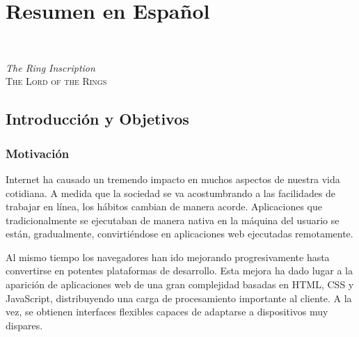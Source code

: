 \chapter{Resumen en Español} %
\label{cha:resumen_en_espanol}

\setlength{\epigraphwidth}{9.5cm}

\epigraph{
\tengwarannataritalic[1.5]
\Textendedcalma\TTthreedots\Tnuumen\Tessenuquerna\TTthreedots\Tungwe\Tando\Toore\TTrightcurl\Tumbar\Ttinco\TTthreedots\Tlambealt\TTrightcurl\Tquesse\TTdoublerightcurl
\Tromanperiod\Ts
\Textendedcalma\TTthreedots\Tnuumen\Tessenuquerna\TTthreedots\Tungwe\Tungwe\Tumbar\TTnasalizer\TTdot\Ttinco\TTthreedots\Tlambe\TTrightcurl
{}\\
\Tempty\Textendedcalma\TTthreedots\Tnuumen\Tessenuquerna\TTthreedots\Tungwe\Tthuule\Troomen\Tquesse\TTthreedots\Ttinco\TTthreedots\Tlambealt\TTrightcurl\Tquesse\TTdoublerightcurl
\Tromanperiod\Ts
\Textendedungwe\TTthreedots\Tumbar\Toore\TTrightcurl\Tesse{}\Tmalta\TTrightcurl\Textendedcalma\TTdot\Ttelco\TTdot\Tquesse\Troomen\Tparma\TTnasalizer\TTdot\Ttinco\TTthreedots\Tlambe\TTrightcurl
\vspace{1em}
}{\textit{The Ring Inscription}\\ \textsc{The Lord of the Rings}}

\newpage

\section{Introducción y Objetivos} %
\label{sec:introduccion_y_objetivos}

\subsection{Motivación} %
\label{sub:motivacion}

Internet ha causado un tremendo impacto en muchos aspectos de nuestra vida cotidiana. A medida que la sociedad se va acostumbrando a las facilidades de trabajar en línea, los hábitos cambian de manera acorde. Aplicaciones que tradicionalmente se ejecutaban de manera nativa en la máquina del usuario se están, gradualmente, convirtiéndose en aplicaciones web ejecutadas remotamente.

Al mismo tiempo los navegadores han ido mejorando progresivamente hasta convertirse en potentes plataformas de desarrollo. Esta mejora ha dado lugar a la aparición de aplicaciones web de una gran complejidad basadas en HTML, CSS y JavaScript, distribuyendo una carga de procesamiento importante al cliente. A la vez, se obtienen interfaces flexibles capaces de adaptarse a dispositivos muy dispares.

